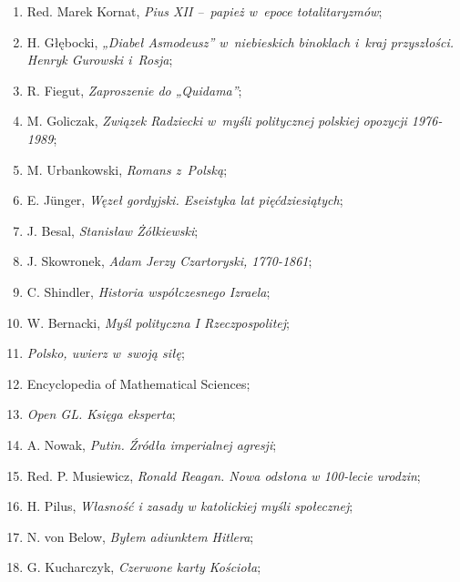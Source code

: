 \documentclass[a4paper,11pt]{article}
\begin{document}
\begin{enumerate}
\item Red. Marek Kornat, \textit{Pius XII --~papież w~epoce
    totalitaryzmów};

\item H. Głębocki, \textit{„Diabeł Asmodeusz” w~niebieskich binoklach
    i~kraj przyszłości. Henryk Gurowski i~Rosja};

\item R. Fiegut, \textit{Zaproszenie do „Quidama”};

\item M. Goliczak, \textit{Związek Radziecki w~myśli politycznej
    polskiej opozycji 1976-1989};

\item M. Urbankowski, \textit{Romans z~Polską};

\item E. J\"{u}nger, \textit{Węzeł gordyjski. Eseistyka lat
    pięćdziesiątych};

\item J. Besal, \textit{Stanisław Żółkiewski};

\item J. Skowronek, \textit{Adam Jerzy Czartoryski, 1770-1861};

\item C. Shindler, \textit{Historia współczesnego Izraela};

\item W. Bernacki, \textit{Myśl polityczna I Rzeczpospolitej};

\item \textit{Polsko, uwierz w~swoją siłę};

\item Encyclopedia of Mathematical Sciences;

\item \textit{Open GL. Księga eksperta};

\item A. Nowak, \textit{Putin. Źródła imperialnej agresji};

\item Red. P. Musiewicz, \textit{Ronald Reagan. Nowa odsłona w 100-lecie
    urodzin};

\item H. Pilus, \textit{Własność i zasady w katolickiej myśli
    społecznej};

\item N. von Below, \textit{Byłem adiunktem Hitlera};

\item G. Kucharczyk, \textit{Czerwone karty Kościoła};


\end{enumerate}
\end{document}
